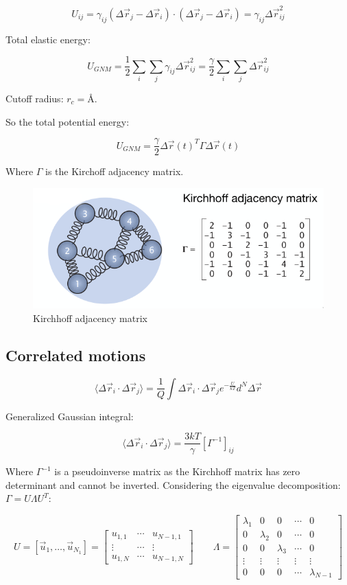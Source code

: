 $$U_{ij} = \gamma_{ij}(\Delta\vec{r}_j-\Delta\vec{r}_i)\cdot(\Delta\vec{r}_j-\Delta\vec{r}_i) = \gamma_{ij}\Delta\vec{r}_{ij}^2$$

Total elastic energy:

$$U_{GNM} = \frac{1}{2}\sum\limits_i\sum\limits_j\gamma_{ij}\Delta\vec{r}^2_{ij} = \frac{\gamma}{2}\sum\limits_i\sum\limits_j\Delta\vec{r}_{ij}^2$$

Cutoff radius: $r_c = \si{\angstrom}$.

So the total potential energy:

$$U_{GNM} = \frac{\gamma}{2}\Delta\vec{r}(t)^T\Gamma\Delta\vec{r}(t)$$

Where $\Gamma$ is the Kirchoff adjacency matrix.

\begin{figure}[H]
	\includegraphics[width=\textwidth]{kirchoff-adjacency-matrix}
	\caption{Kirchhoff adjacency matrix}
	\label{fig:kirchhoff-adjacency}
\end{figure}

	\subsection{Correlated motions}

	$$\langle\Delta\vec{r}_i\cdot\Delta\vec{r}_j\rangle = \frac{1}{Q}\int\Delta\vec{r}_i\cdot\Delta\vec{r}_je^{-\frac{U}{kT}}d^N\Delta\vec{r}$$

	Generalized Gaussian integral:

	$$\langle\Delta\vec{r}_i\cdot\Delta\vec{r}_j\rangle = \frac{3kT}{\gamma}[\Gamma^{-1}]_{ij}$$

	Where $\Gamma^{-1}$ is a pseudoinverse matrix as the Kirchhoff matrix has zero determinant and cannot be inverted.
	Considering the eigenvalue decomposition: $\Gamma = U\Lambda U^T$:

	$$U = [\vec{u}_1, \dots, \vec{u}_{N_1}] = \begin{bmatrix} u_{1,1} & \cdots & u_{N-1,1}\\\vdots & \cdots & \vdots\\ u_{1, N} & \cdots & u_{N-1, N}\end{bmatrix}\qquad\Lambda = \begin{bmatrix} \lambda_1 & 0 & 0 & \cdots & 0\\ 0 & \lambda_2 & 0 &\cdots & 0\\0 & 0& \lambda_3 & \cdots & 0\\\vdots & \vdots & \vdots & \vdots &\vdots\\ 0 & 0 & 0 & \cdots & \lambda_{N-1}\end{bmatrix}$$

